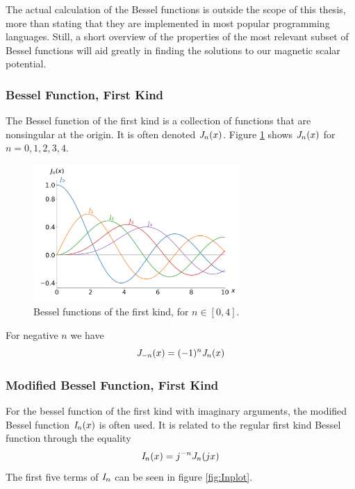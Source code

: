 The actual calculation of the Bessel functions is outside the scope of this thesis,
more than stating that they are implemented in most popular programming languages.
Still, a short overview of the properties of the most relevant subset of Bessel
functions will aid greatly in finding the solutions to our magnetic scalar potential.
\cite{weisstein_bessel}
\subsubsection{Bessel Function, First Kind}

The Bessel function of the first kind is a collection of functions that are nonsingular
at the origin. It is often denoted $\mathit{J}_{n}(x)$. Figure \ref*{fig:Jnplot} shows
$\mathit{J}_{n}(x)$ for $n=0,1,2,3,4$.\cite{weisstein_bessel_first_kind}

\begin{figure}[h]
    \centering
    \includegraphics[width=0.7\textwidth]{figs/Jnplot.png}
    \caption{Bessel functions of the first kind, for $n\in[0,4]$.}
    \label{fig:Jnplot}
\end{figure}

For negative $n$ we have
\begin{equation}
    \mathit{J}_{-n}(x) = (-1)^n \mathit{J}_{n}(x)
\end{equation}

\subsubsection{Modified Bessel Function, First Kind}
For the bessel function of the first kind with imaginary
arguments, the modified Bessel function $\mathit{I}_{n}(x)$ is often used.
It is related to the regular first kind Bessel function
through the equality
\begin{equation}
    \mathit{I}_{n}(x) = j^{-n}\mathit{J}_{n}(jx)
\end{equation}
\cite{weisstein_modified}
The first five terms of $\mathit{I}_{n}$ can be seen in figure \ref*{fig:Inplot}.

